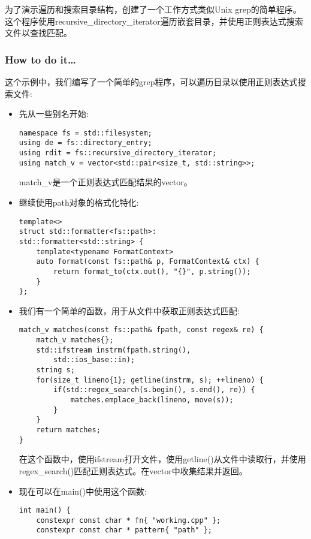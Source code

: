 
为了演示遍历和搜索目录结构，创建了一个工作方式类似Unix grep的简单程序。这个程序使用recursive\_directory\_iterator遍历嵌套目录，并使用正则表达式搜索文件以查找匹配。

\subsubsection{How to do it…}

这个示例中，我们编写了一个简单的grep程序，可以遍历目录以使用正则表达式搜索文件:

\begin{itemize}
\item 
先从一些别名开始:

\begin{lstlisting}[style=styleCXX]
namespace fs = std::filesystem;
using de = fs::directory_entry;
using rdit = fs::recursive_directory_iterator;
using match_v = vector<std::pair<size_t, std::string>>;
\end{lstlisting}

match\_v是一个正则表达式匹配结果的vector。

\item 
继续使用path对象的格式化特化:

\begin{lstlisting}[style=styleCXX]
template<>
struct std::formatter<fs::path>:
std::formatter<std::string> {
	template<typename FormatContext>
	auto format(const fs::path& p, FormatContext& ctx) {
		return format_to(ctx.out(), "{}", p.string());
	}
};
\end{lstlisting}

\item 
我们有一个简单的函数，用于从文件中获取正则表达式匹配:

\begin{lstlisting}[style=styleCXX]
match_v matches(const fs::path& fpath, const regex& re) {
	match_v matches{};
	std::ifstream instrm(fpath.string(),
		std::ios_base::in);
	string s;
	for(size_t lineno{1}; getline(instrm, s); ++lineno) {
		if(std::regex_search(s.begin(), s.end(), re)) {
			matches.emplace_back(lineno, move(s));
		}
	}
	return matches;
}
\end{lstlisting}

在这个函数中，使用ifstream打开文件，使用getline()从文件中读取行，并使用regex\_search()匹配正则表达式。在vector中收集结果并返回。

\item 
现在可以在main()中使用这个函数:

\begin{lstlisting}[style=styleCXX]
int main() {
	constexpr const char * fn{ "working.cpp" };
	constexpr const char * pattern{ "path" };
	

\end{lstlisting}
\end{itemize}
